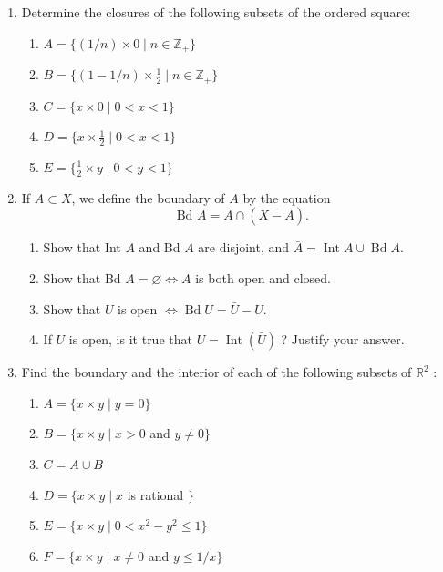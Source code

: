 \begin{enumerate}[itemsep=0.4em, parsep=0pt, topsep=0pt, partopsep=0pt, leftmargin=*, label=\arabic*., ref=\arabic*]
\item Determine the closures of the following subsets of the ordered square:
  \begin{enumerate}[itemsep=0.2em, parsep=0pt, topsep=0pt, partopsep=0pt, leftmargin=3em, label={}]
  \item \(A = \{ ( {1/n}) \times 0 \mid n \in {\mathbb{Z}}_{+} \}\)
  \item \(B = \{ ( {1 - 1/n}) \times \frac{1}{2} \mid n \in {\mathbb{Z}}_{+} \}\)
  \item \(C = \{ x \times 0 \mid 0 < x < 1 \}\)
  \item \(D = \{ x \times \frac{1}{2} \mid 0 < x < 1 \}\)
  \item \(E = \{ \frac{1}{2} \times y \mid 0 < y < 1 \}\)
  \end{enumerate}
\item If \(A \subset X\), we define the boundary of \(A\) by the equation \[ \text{ Bd }A = \bar{A} \cap ( \overline{X - A}) \text{.} \]
  \begin{enumerate}[itemsep=0.2em, parsep=0pt, topsep=0pt, partopsep=0pt, leftmargin=*, label=(\alph*), align=left]
  \item Show that Int \(A\) and Bd \(A\) are disjoint, and \(\bar{A} = \operatorname{Int}A \cup \operatorname{Bd}A\).
  \item Show that Bd \(A = \varnothing \Leftrightarrow A\) is both open and closed.
  \item Show that \(U\) is open \(\Leftrightarrow \operatorname{Bd}U = \bar{U} - U\).
  \item If \(U\) is open, is it true that \(U = \operatorname{Int}( \bar{U})\) ? Justify your answer.
  \end{enumerate}
\item Find the boundary and the interior of each of the following subsets of \(\mathbb{R}^{2}\) :
  \begin{enumerate}[itemsep=0.2em, parsep=0pt, topsep=0pt, partopsep=0pt, leftmargin=*, label=(\alph*), align=left]
  \item \(A = \{ x \times y \mid y = 0\}\)
  \item \(B = \{ x \times y \mid x > 0\) and \(y \neq 0\}\)
  \item \(C = A \cup B\)
  \item \(D = \{ x \times y \mid x\) is rational \(\}\)
  \item \(E = \{ {x \times y \mid 0 < x^{2} - y^{2} \leq 1}\}\)
  \item \(F = \{ x \times y \mid x \neq 0\) and \(y \leq 1/x\}\)

\end{enumerate}
\end{enumerate}
